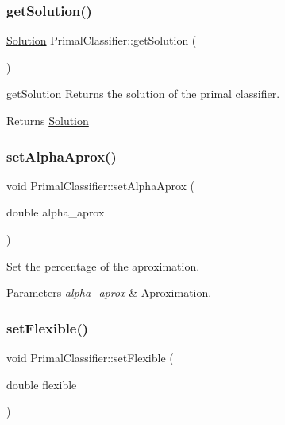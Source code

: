 \subsubsection{\texorpdfstring{get\+Solution()}{getSolution()}}
{\footnotesize\ttfamily \hyperlink{class_solution}{Solution} Primal\+Classifier\+::get\+Solution (\begin{DoxyParamCaption}{ }\end{DoxyParamCaption})}



get\+Solution Returns the solution of the primal classifier. 

\begin{DoxyReturn}{Returns}
\hyperlink{class_solution}{Solution} 
\end{DoxyReturn}
\mbox{\label{class_primal_classifier_a49be3fca8d8383d98f9d671d1e1f27c7}} 
\subsubsection{\texorpdfstring{set\+Alpha\+Aprox()}{setAlphaAprox()}}
{\footnotesize\ttfamily void Primal\+Classifier\+::set\+Alpha\+Aprox (\begin{DoxyParamCaption}\item[{double}]{alpha\+\_\+aprox }\end{DoxyParamCaption})}



Set the percentage of the aproximation. 


\begin{DoxyParams}{Parameters}
{\em alpha\+\_\+aprox} & Aproximation. \\
\hline
\end{DoxyParams}
\mbox{\label{class_primal_classifier_acf3edea17de00a41c33d0fee4fabd4da}} 
\subsubsection{\texorpdfstring{set\+Flexible()}{setFlexible()}}
{\footnotesize\ttfamily void Primal\+Classifier\+::set\+Flexible (\begin{DoxyParamCaption}\item[{double}]{flexible }\end{DoxyParamCaption})}



